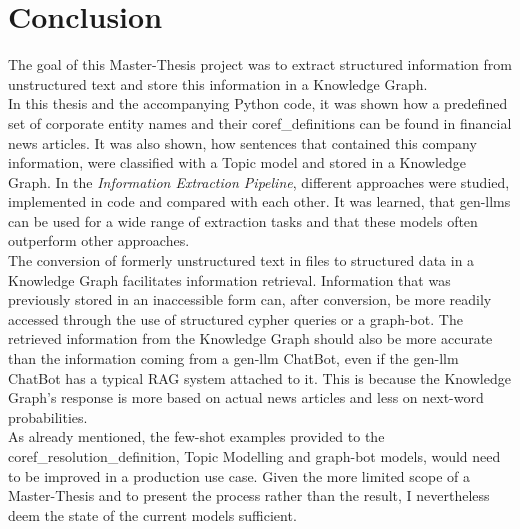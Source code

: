 \chapter{Conclusion}

The goal of this Master-Thesis project was to extract structured information from unstructured text and store this information in a Knowledge Graph.\\

In this thesis and the accompanying Python code, it was shown how a predefined set of corporate entity names and their \glspl{coref_definition} can be found in financial news articles.
It was also shown, how sentences that contained this company information, were classified with a Topic model and stored in a Knowledge Graph.
In the \emph{Information Extraction Pipeline}, different approaches were studied, implemented in code and compared with each other.
It was learned, that \gls{gen-llm}s can be used for a wide range of extraction tasks and that these models often outperform other approaches.\\

The conversion of formerly unstructured text in files to structured data in a Knowledge Graph facilitates information retrieval.
Information that was previously stored in an inaccessible form can, after conversion, be more readily accessed through the use of structured \gls{cypher} queries or a \gls{graph-bot}.
The retrieved information from the Knowledge Graph should also be more accurate than the information coming from a \gls{gen-llm} ChatBot, even if the \gls{gen-llm} ChatBot has a typical \gls{RAG} system attached to it.
This is because the Knowledge Graph's response is more based on actual news articles and less on next-word probabilities.\\

As already mentioned, the few-shot examples provided to the \gls{coref_resolution_definition}, Topic Modelling and \gls{graph-bot} models, would need to be improved
in a production use case.
Given the more limited scope of a Master-Thesis and to present the process rather than the result, I nevertheless deem the state of the current models sufficient.\\

